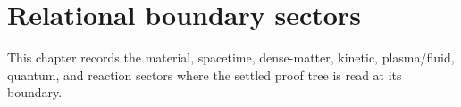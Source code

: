 \chapter{Relational boundary sectors}\label{ch:relational-physics-contextuality}

This chapter records the material, spacetime, dense-matter, kinetic,
plasma/fluid, quantum, and reaction sectors where the settled proof tree is
read at its boundary.







